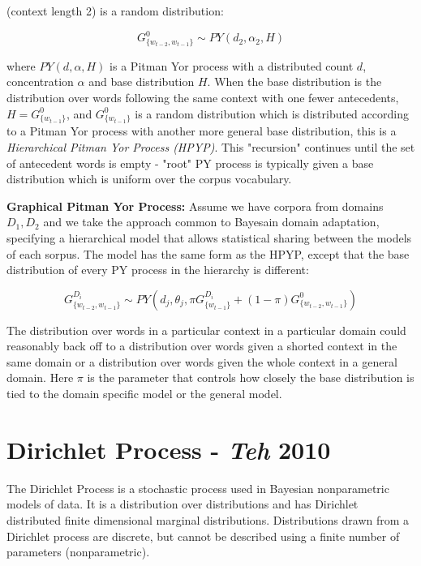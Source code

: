 \noindent (context length 2) is a random distribution:

\begin{equation}
G_{\{w_{t-2}, w_{t-1}\}}^{0} \sim PY(d_{2}, \alpha_{2}, H)
\label{eq:PYDistributionPY}
\end{equation}

\noindent where $PY(d, \alpha, H)$ is a Pitman Yor process with a distributed count $d$, concentration $\alpha$ and base distribution $H$. When the base distribution is the distribution over words following the same context with one fewer antecedents, $H=G_{\{w_{t-1}\}}^{0}$, and $G_{\{w_{t-1}\}}^{0}$ is a random distribution which is distributed according to a Pitman Yor process with another more general base distribution, this is a \textit{Hierarchical Pitman Yor Process (HPYP)}. This "recursion" continues until the set of antecedent words is empty - "root" PY process is typically given a base distribution which is uniform over the corpus vocabulary.

\textbf{Graphical Pitman Yor Process:} Assume we have corpora from domains $D_{1}, D_{2}$ and we take the approach common to Bayesain domain adaptation, specifying a hierarchical model that allows statistical sharing between the models of each sorpus. The model has the same form as the HPYP, except that the base distribution of every PY process in the hierarchy is different:

\begin{equation}
G_{\{w_{t-2}, w_{t-1}\}}^{D_{i}} \sim PY(d_{j}, \theta_{j}, \pi G_{\{w_{t-1}\}}^{D_{i}} + (1-\pi)G_{\{w_{t-2}, w_{t-1}\}}^{0})
\label{eq:graphicalPY}
\end{equation}

\noindent The distribution over words in a particular context in a particular domain could reasonably back off to a distribution over words given a shorted context in the same domain or a distribution over words given the whole context in a general domain. Here $\pi$ is the parameter that controls how closely the base distribution is tied to the domain specific model or the general model.

\section{Dirichlet Process - \textit{Teh} 2010}

The Dirichlet Process is a stochastic process used in Bayesian nonparametric models of data. It is a distribution over distributions and has Dirichlet distributed finite dimensional marginal distributions. Distributions drawn from a Dirichlet process are discrete, but cannot be described using a finite number of parameters (nonparametric).

